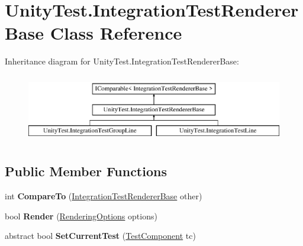 \hypertarget{class_unity_test_1_1_integration_test_renderer_base}{}\section{Unity\+Test.\+Integration\+Test\+Renderer\+Base Class Reference}
\label{class_unity_test_1_1_integration_test_renderer_base}
Inheritance diagram for Unity\+Test.\+Integration\+Test\+Renderer\+Base\+:\begin{figure}[H]
\begin{center}
\leavevmode
\includegraphics[height=3.000000cm]{class_unity_test_1_1_integration_test_renderer_base}
\end{center}
\end{figure}
\subsection*{Public Member Functions}
\begin{DoxyCompactItemize}
\item 
\mbox{\label{class_unity_test_1_1_integration_test_renderer_base_a390c2484aefe9e132b80648f0d23928b}} 
int {\bfseries Compare\+To} (\hyperlink{class_unity_test_1_1_integration_test_renderer_base}{Integration\+Test\+Renderer\+Base} other)
\item 
\mbox{\label{class_unity_test_1_1_integration_test_renderer_base_ae6f94b122cf4ca08abfc9de24b40d839}} 
bool {\bfseries Render} (\hyperlink{class_unity_test_1_1_rendering_options}{Rendering\+Options} options)
\item 
\mbox{\label{class_unity_test_1_1_integration_test_renderer_base_ae89ef43bb217ce70dbba12b79ca0328a}} 
abstract bool {\bfseries Set\+Current\+Test} (\hyperlink{class_unity_test_1_1_test_component}{Test\+Component} tc)
\end{DoxyCompactItemize}

